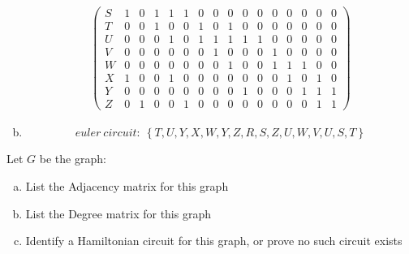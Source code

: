 \documentclass[10pt,letterpaper, cm]{hmcpset}
\begin{document}
\begin{enumerate}[(a)]
\begin{align*}
\begin{pmatrix}
         S   & 1 & 0 & 1 & 1 & 1 & 0 & 0 & 0 & 0 & 0 & 0 & 0 & 0 & 0 & 0 \\

         T   & 0 & 0 & 1 & 0 & 0 & 1 & 0 & 1 & 0 & 0 & 0 & 0 & 0 & 0 & 0  \\

         U   & 0 & 0 & 0 & 1 & 0 & 1 & 1 & 1 & 1 & 1 & 0 & 0 & 0 & 0 & 0 \\

         V   & 0 & 0 & 0 & 0 & 0 & 0 & 1 & 0 & 0 & 0 & 1 & 0 & 0 & 0 & 0 \\

         W   & 0 & 0 & 0 & 0 & 0 & 0 & 0 & 1 & 0 & 0 & 1 & 1 & 1 & 0 & 0 \\

         X   & 1 & 0 & 0 & 1 & 0 & 0 & 0 & 0 & 0 & 0 & 0 & 1 & 0 & 1 & 0 \\

         Y   & 0 & 0 & 0 & 0 & 0 & 0 & 0 & 0 & 1 & 0 & 0 & 0 & 1 & 1 & 1 \\
         
         Z   & 0 & 1 & 0 & 0 & 1 & 0 & 0 & 0 & 0 & 0 & 0 & 0 & 0 & 1 & 1

      \end{pmatrix}  
              \end{align*}

  \item
    \begin{equation*}
      euler~circuit:~\left\{T, U, Y, X, W, Y, Z, R, S, Z, U, W, V, U, S, T\right\}
    \end{equation*}
\end{enumerate}

\begin{problem}[9]
    Let $G$ be the graph:
    \begin{center}
    \end{center}

    \begin{enumerate}[(a)]
        \item List the Adjacency matrix for this graph
        \item List the Degree matrix for this graph
        \item Identify a Hamiltonian circuit for this graph, or prove no such circuit exists
    \end{enumerate}
\end{problem}
\end{document}

